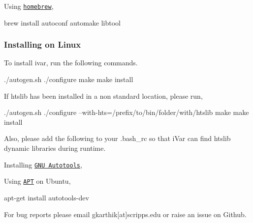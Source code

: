 Using \href{https://brew.sh/}{\tt homebrew},


\begin{DoxyCode}
brew install autoconf automake libtool
\end{DoxyCode}


\subsubsection*{Installing on Linux}

To install ivar, run the following commands.


\begin{DoxyCode}
./autogen.sh
./configure
make
make install
\end{DoxyCode}


If htslib has been installed in a non standard location, please run,


\begin{DoxyCode}
./autogen.sh
./configure --with-hts=/prefix/to/bin/folder/with/htslib
make
make install
\end{DoxyCode}


Also, please add the following to your .bash\+\_\+rc so that i\+Var can find htslib dynamic libraries during runtime.




Installing \href{https://www.gnu.org/software/automake/manual/html_node/Autotools-Introduction.html#Autotools-Introduction}{\tt G\+NU Autotools},

Using \href{https://help.ubuntu.com/lts/serverguide/apt.html}{\tt A\+PT} on Ubuntu,


\begin{DoxyCode}
apt-get install autotools-dev
\end{DoxyCode}


For bug reports please email gkarthik\mbox{[}at\mbox{]}scripps.\+edu or raise an issue on Github. 